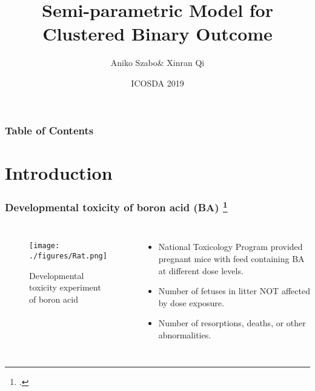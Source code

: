 \documentclass[hyperref={bookmarks=false},aspectratio=169]{beamer}
\title[Semi-parametric model]
{\bfseries{Semi-parametric Model for Clustered Binary Outcome}}
\author[Aniko Szabo, Xinran Qi]
{Aniko Szabo\& Xinran Qi}
\institute[MCW]
{Medical College of Wisconsin}
\date[October 11, 2019]
{\footnotesize ICOSDA 2019}
\begin{document}
\frame{\titlepage}  %

\begin{frame}
\frametitle{Table of Contents}
\tableofcontents
\end{frame}



\section{Introduction}

\begin{frame}
\frametitle{Developmental toxicity of boron acid (BA) \footcite{heindel1994developmental}}

\begin{columns}


\begin{figure}
    \centering
    \texttt{[image: ./figures/Rat.png]}
    \caption{Developmental toxicity experiment of boron acid}
    \label{fig:ratExperiment}
\end{figure}

\begin{itemize}
    \item National Toxicology Program provided pregnant mice with feed containing BA at different dose levels.
    \item Number of fetuses in litter NOT affected by dose exposure.
    \item Number of resorptions, deaths, or other abnormalities.
\end{itemize}

\end{columns}
\end{frame}
\end{document}
